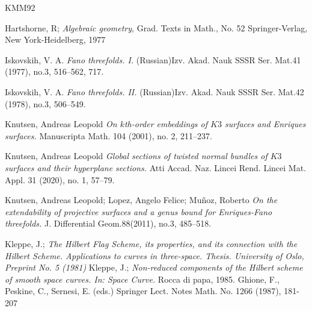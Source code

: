 \documentclass[11pt,twoside]{amsart}
\theoremstyle{plain}
\numberwithin{equation}{section}
\theoremstyle{definition}
\begin{document}
\begin{thebibliography}{KMM92}
  \color{black}


Hartshorne, R; \emph{Algebraic geometry}, 
Grad. Texts in Math., No. 52
Springer-Verlag, New York-Heidelberg, 1977

\color{black}
  




Iskovskih, V. A.
\emph{Fano threefolds. I.}
(Russian)Izv. Akad. Nauk SSSR Ser. Mat.41 (1977), no.3, 516–562, 717.

Iskovskih, V. A.
\emph{Fano threefolds. II.}
(Russian)Izv. Akad. Nauk SSSR Ser. Mat.42 (1978), no.3, 506–549.



Knutsen, Andreas Leopold
\emph{On $k$th-order embeddings of $K3$ surfaces and Enriques surfaces.}
Manuscripta Math. 104 (2001), no. 2, 211–237.

Knutsen, Andreas Leopold
\emph{Global sections of twisted normal bundles of $K3$ surfaces and their hyperplane sections.}
Atti Accad. Naz. Lincei Rend. Lincei Mat. Appl. 31 (2020), no. 1, 57–79.


Knutsen, Andreas Leopold; Lopez, Angelo Felice; Muñoz, Roberto
\emph{On the extendability of projective surfaces and a genus bound for Enriques-Fano threefolds.}
J. Differential Geom.88(2011), no.3, 485–518.

Kleppe, J.; 
\emph{The Hilbert Flag Scheme, its properties, and its connection with the Hilbert Scheme. Applications to curves in three-space. Thesis. University of Oslo, Preprint No. 5 (1981)}
Kleppe, J.;
\emph{Non-reduced components of the Hilbert scheme of smooth space curves. In: Space Curve.}
Rocca di papa, 1985. Ghione, F., Peskine, C., Sernesi, E. (eds.) Springer Lect. Notes Math. No. 1266 (1987), 181-207



  








\end{thebibliography}
\end{document}
